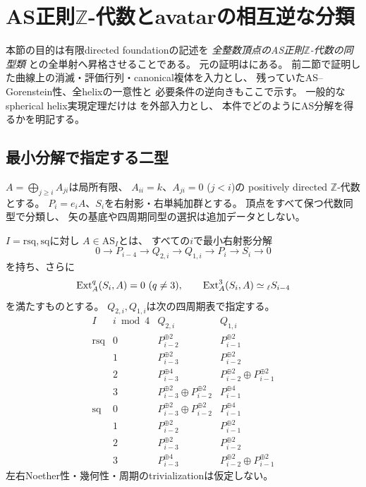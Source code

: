 \section{AS正則\texorpdfstring{$\mathbb Z$}{Z}-代数とavatarの相互逆な分類}
\label{sec:qa-as-avatar-classification}

本節の目的は有限directed foundationの記述を
\emph{全整数頂点のAS正則$\mathbb Z$-代数の同型類}
との全単射へ昇格させることである。
元の証明は\cite[第2--8節，第11--12節]{AvatarVSeven2026}にある。
前二節で証明した曲線上の消滅・評価行列・canonical複体を入力とし、
残っていたAS--Gorenstein性、全helixの一意性と
必要条件の逆向きもここで示す。
一般的なspherical helix実現定理だけは
\cite[Theorem 5]{OkawaUedaSpherical2020}を外部入力とし、
本件でどのようにAS分解を得るかを明記する。

\subsection{最小分解で指定する二型}
\label{subsec:qa-as-minimal-types}

$A=\bigoplus_{j\ge i}A_{ji}$は局所有限、
$A_{ii}=k$、$A_{ji}=0$ ($j<i$)の
positively directed $\mathbb Z$-代数とする。
$P_i=e_iA$、$S_i$を右射影・右単純加群とする。
頂点をすべて保つ代数同型で分類し、
矢の基底や四周期同型の選択は追加データとしない。

\begin{definition}[二つのAS型]
\label{def:qa-as-square-rotated-minimal}
$I=\mathrm{rsq},\mathrm{sq}$に対し
$A\in\mathrm{AS}_{I}$とは、
すべての$i$で最小右射影分解
\begin{equation}
0\to P_{i-4}\to Q_{2,i}\to Q_{1,i}
 \to P_i\to S_i\to0
\label{eq:qa-as-two-minimal-resolutions}
\end{equation}
を持ち、さらに
\begin{equation}
\Ext_A^q(S_i,A)=0\ (q\ne3),\qquad
\Ext_A^3(S_i,A)\simeq {}_\ell S_{i-4}
\label{eq:qa-as-two-gorenstein}
\end{equation}
を満たすものとする。
$Q_{2,i},Q_{1,i}$は次の四周期表で指定する。
\[
\begin{array}{c|c|l|l}
I&i\bmod4&Q_{2,i}&Q_{1,i}\\ \hline
\mathrm{rsq}&0&P_{i-2}^{\oplus2}&P_{i-1}^{\oplus2}\\
&1&P_{i-3}^{\oplus2}&P_{i-2}^{\oplus2}\\
&2&P_{i-3}^{\oplus4}&P_{i-2}^{\oplus2}\oplus P_{i-1}^{\oplus2}\\
&3&P_{i-3}^{\oplus2}\oplus P_{i-2}^{\oplus2}&P_{i-1}^{\oplus4}\\ \hline
\mathrm{sq}&0&P_{i-3}^{\oplus2}\oplus P_{i-2}^{\oplus2}&P_{i-1}^{\oplus4}\\
&1&P_{i-2}^{\oplus2}&P_{i-1}^{\oplus2}\\
&2&P_{i-3}^{\oplus2}&P_{i-2}^{\oplus2}\\
&3&P_{i-3}^{\oplus4}&P_{i-2}^{\oplus2}\oplus P_{i-1}^{\oplus2}
\end{array}
\]
左右Noether性・幾何性・周期のtrivializationは仮定しない。
\end{definition}

